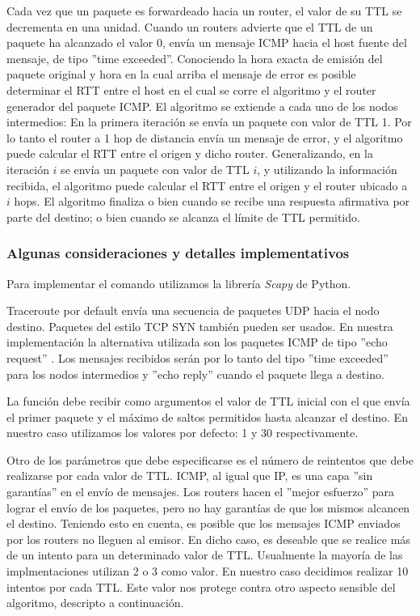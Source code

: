 Cada vez que un paquete es forwardeado hacia un router, el valor de su TTL se decrementa en una unidad.
Cuando un routers advierte que el TTL de un paquete ha alcanzado el valor 0, env\'ia un mensaje ICMP hacia
el host fuente del mensaje, de tipo ''time exceeded''. Conociendo la hora exacta de emisi\'on del paquete
original y hora en la cual arriba el mensaje de error es posible determinar el RTT entre el host en el cual se corre el algoritmo
y el router generador del paquete ICMP.
El algoritmo se extiende a cada uno de los nodos intermedios:
En la primera iteraci\'on se env\'ia un paquete con valor de TTL 1. Por lo tanto el router a 1 hop de
distancia env\'ia un mensaje de error, y el algoritmo puede calcular el RTT entre el origen y dicho
router.
Generalizando, en la iteraci\'on $i$ se env\'ia un paquete con valor de TTL $i$, y utilizando la informaci\'on
recibida, el algoritmo puede calcular el RTT entre el origen y el router ubicado a $i$ hops.
El algoritmo finaliza o bien cuando se recibe una respuesta afirmativa por parte del destino; o bien
cuando se alcanza el l\'imite de TTL permitido.

\subsubsection{Algunas consideraciones y detalles implementativos}

Para implementar el comando utilizamos la librer\'ia \emph{Scapy} de Python.

Traceroute por default env\'ia una secuencia de paquetes UDP hacia el nodo destino. Paquetes del estilo
TCP SYN tambi\'en pueden ser usados. En nuestra implementaci\'on la alternativa utilizada son los paquetes
ICMP de tipo ''echo request'' . Los mensajes recibidos ser\'an por lo tanto del tipo ''time exceeded''
para los nodos intermedios y ''echo reply'' cuando el paquete llega a destino.

La funci\'on debe recibir como argumentos el valor de TTL inicial con el que env\'ia el primer paquete
y el m\'aximo de saltos permitidos hasta alcanzar el destino. En nuestro caso utilizamos los valores
por defecto: 1 y 30 respectivamente.

Otro de los par\'ametros que debe especificarse es el n\'umero de reintentos que debe realizarse por cada
valor de TTL. ICMP, al igual que IP, es una capa ''sin garant\'ias'' en el env\'io de mensajes. Los routers
hacen el ''mejor esfuerzo'' para lograr el env\'io de los paquetes, pero no hay garant\'ias de que los mismos
alcancen el destino.
Teniendo esto en cuenta, es posible que los mensajes ICMP enviados por los routers no lleguen al emisor.
En dicho caso, es deseable que se realice m\'as de un intento para un determinado valor de TTL.
Usualmente la mayor\'ia de las implmentaciones utilizan 2 o 3 como valor. En nuestro caso decidimos
realizar 10 intentos por cada TTL. Este valor nos protege contra otro aspecto sensible del algoritmo,
descripto a continuaci\'on.

